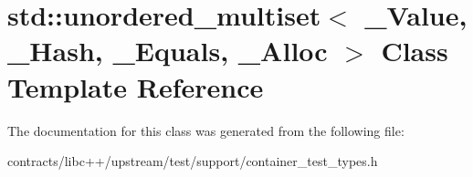 \hypertarget{classstd_1_1unordered__multiset}{}\section{std\+:\+:unordered\+\_\+multiset$<$ \+\_\+\+Value, \+\_\+\+Hash, \+\_\+\+Equals, \+\_\+\+Alloc $>$ Class Template Reference}
\label{classstd_1_1unordered__multiset}


The documentation for this class was generated from the following file\+:\begin{DoxyCompactItemize}
\item 
contracts/libc++/upstream/test/support/container\+\_\+test\+\_\+types.\+h\end{DoxyCompactItemize}
